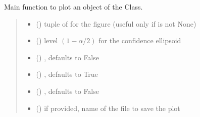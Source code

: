 \documentclass[letterpaper,10pt,english]{sphinxmanual}
\begin{document}
\begin{fulllineitems}
\begin{fulllineitems}
\label{\detokenize{cubmods:cubmods.cubsh.CUBresCUBSH.plot}}
\pysigstartsignatures
{}
\pysigstopsignatures
\sphinxAtStartPar
Main function to plot an object of the Class.
\begin{quote}\begin{description}
\begin{itemize}
\item {} 
\sphinxAtStartPar
{} () \textendash{} tuple of  for the figure (useful only if  is not None)

\item {} 
\sphinxAtStartPar
{} () \textendash{} level \((1-\alpha/2)\) for the confidence ellipsoid

\item {} 
\sphinxAtStartPar
{} () \textendash{} , defaults to False

\item {} 
\sphinxAtStartPar
{} () \textendash{} , defaults to True

\item {} 
\sphinxAtStartPar
{} () \textendash{} , defaults to False

\item {} 
\sphinxAtStartPar
{} () \textendash{} if provided, name of the file to save the plot


\end{itemize}
\end{description}
\end{quote}
\end{fulllineitems}
\end{fulllineitems}
\end{document}
